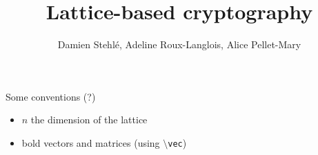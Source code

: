 \documentclass[a4paper,11pt]{article}
\title{Lattice-based cryptography}
\author{Damien Stehlé, Adeline Roux-Langlois, Alice Pellet-Mary}
\theoremstyle{definition}
\begin{document}
\maketitle

Some conventions (?)
\begin{itemize}
\item $n$ the dimension of the lattice
\item bold vectors and matrices (using \texttt{$\setminus$vec})
\end{itemize}

\tableofcontents







\end{document}
